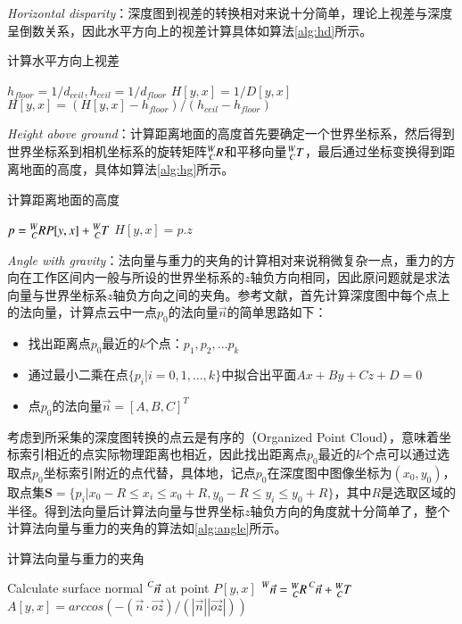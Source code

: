 \emph{Horizontal disparity}：深度图到视差的转换相对来说十分简单，理论上视差与深度呈倒数关系，因此水平方向上的视差计算具体如算法\ref{alg:hd}所示。
\begin{algorithm}[!ht]
  \caption{计算水平方向上视差}
  \label{alg:hd}
  $h_{floor} = 1 / d_{ceil}, h_{ceil} = 1 / d_{floor}$\;
   {
     {
      $H[y, x] = 1 / D[y, x]$\;
      $H[y, x] = (H[y, x] - h_{floor}) / (h_{ceil} - h_{floor})$\;
    }
  }
\end{algorithm}

\emph{Height above ground}：计算距离地面的高度首先要确定一个世界坐标系，然后得到世界坐标系到相机坐标系的旋转矩阵$\prescript{W}{C}{R}$和平移向量$\prescript{W}{C}{T}$，最后通过坐标变换得到距离地面的高度，具体如算法\ref{alg:hg}所示。
\begin{algorithm}[!ht]
  \caption{计算距离地面的高度}
  \label{alg:hg}
   {
     {
      $p =  \prescript{W}{C}{R}P[y, x] + \prescript{W}{C}{T}$\;
      $H[y, x] = p.z$\;
    }
  }
\end{algorithm}

\emph{Angle with gravity}：法向量与重力的夹角的计算相对来说稍微复杂一点，重力的方向在工作区间内一般与所设的世界坐标系的$z$轴负方向相同，因此原问题就是求法向量与世界坐标系$z$轴负方向之间的夹角。参考文献\cite{Gupta2013}，首先计算深度图中每个点上的法向量，计算点云中一点$p_0$的法向量$\vec{n}$的简单思路如下：
\begin{itemize}
\item 找出距离点$p_0$最近的$k$个点：$p_1, p_2,...p_k$
\item 通过最小二乘在点$\{p_i|i = 0, 1, \ldots , k\}$中拟合出平面$Ax + By + Cz + D = 0$
\item 点$p_0$的法向量$\vec{n} = [A, B, C]^T$
\end{itemize}
考虑到所采集的深度图转换的点云是有序的（Organized Point Cloud），意味着坐标索引相近的点实际物理距离也相近，因此找出距离点$p_0$最近的$k$个点可以通过选取点$p_0$坐标索引附近的点代替，具体地，记点$p_0$在深度图中图像坐标为$(x_0, y_0)$，取点集$\bm{S} = \{p_i|x_0 - R \leq x_i \leq x_0 + R , y_0 -R \leq y_i \leq y_0 + R\}$，其中$R$是选取区域的半径。得到法向量后计算法向量与世界坐标$z$轴负方向的角度就十分简单了，整个计算法向量与重力的夹角的算法如\ref{alg:angle}所示。
\begin{algorithm}[!ht]
  \caption{计算法向量与重力的夹角}
  \label{alg:angle}
   {
     {
      Calculate surface normal $\prescript{C}{}{\vec{n}}$ at point $P[y,x]$\;
      $\prescript{W}{}{\vec{n}} =  \prescript{W}{C}{R}\prescript{C}{}{\vec{n}} + \prescript{W}{C}{T}$\;
      $A[y, x] = arccos(-(\vec{n}\cdot\vec{oz}) / (|\vec{n}||\vec{oz}|))$\;
    }
  }
\end{algorithm}

